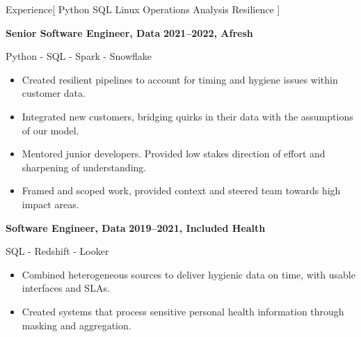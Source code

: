 \documentclass[11pt,a4paper]{article}
\begin{document}
\begin{mysection}{Experience}[
    Python
    \textbullet{} SQL
    \textbullet{} Linux
    \textbullet{} Operations
    \textbullet{} Analysis
    \textbullet{} Resilience
]
\begin{addmargin}[0.5em]{0em}
\begin{adjustwidth}{1ex}{0ex}
\begin{itemize}
      \end{itemize}

    \end{adjustwidth}
  \end{addmargin}
  \medskip


  \begin{addmargin}[0.5em]{0em}
    {\large\bfseries Senior Software Engineer, Data}%
    \hfill {\bfseries 2021--2022, Afresh}%
    \begin{adjustwidth}{1ex}{0ex}
      Python - SQL - Spark - Snowflake

      \begin{itemize}
        [label=-, topsep=0pt, itemsep=0.5ex, parsep=0pt, leftmargin=1em]
      \item Created resilient pipelines to account for timing and hygiene issues
            within customer data.
      \item Integrated new customers, bridging quirks in their data with the
            assumptions of our model.
      \item Mentored junior developers.  Provided low stakes direction of effort
            and sharpening of understanding.
      \item Framed and scoped work, provided context and steered team towards
            high impact areas.
      \end{itemize}
    \end{adjustwidth}
  \end{addmargin}
  \medskip


  \begin{addmargin}[0.5em]{0em}
    {\large\bfseries Software Engineer, Data}%
    \hfill {\bfseries 2019--2021, Included Health}%
      \begin{adjustwidth}{1ex}{0ex}
      SQL - Redshift - Looker

      \begin{itemize}
        [label=-, topsep=0pt, itemsep=0.5ex, parsep=0pt, leftmargin=1em]
      \item Combined heterogeneous sources to deliver hygienic data on time,
          with usable interfaces and SLAs.
      \item Created systems that process sensitive personal health information
            through masking and aggregation.
      \end{itemize}
      \end{adjustwidth}
    \end{addmargin}
    \medskip



\end{mysection}
\end{document}
